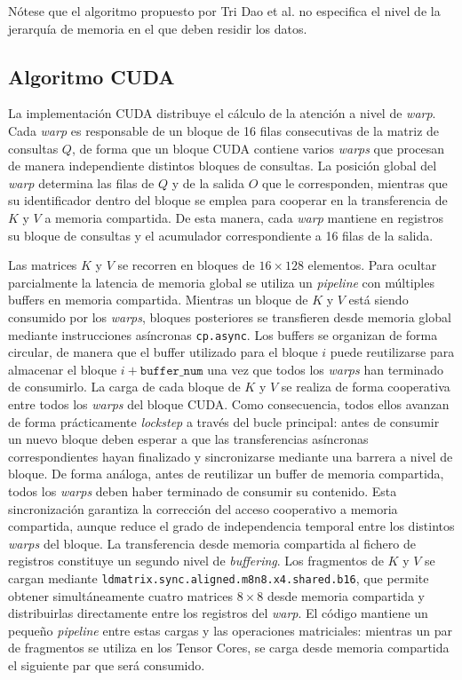 Nótese que el algoritmo propuesto por Tri Dao et al. no especifica el nivel de la jerarquía de memoria en el que deben residir los datos.

\subsection{Algoritmo CUDA}

La implementación CUDA distribuye el cálculo de la atención a nivel de \textit{warp}. Cada \textit{warp} es responsable de un bloque de 16 filas consecutivas de la matriz de consultas \(Q\), de forma que un bloque CUDA contiene varios \textit{warps} que procesan de manera independiente distintos bloques de consultas. La posición global del \textit{warp} determina las filas de \(Q\) y de la salida \(O\) que le corresponden, mientras que su identificador dentro del bloque se emplea para cooperar en la transferencia de \(K\) y \(V\) a memoria compartida. De esta manera, cada \textit{warp} mantiene en registros su bloque de consultas y el acumulador correspondiente a 16 filas de la salida.

Las matrices \(K\) y \(V\) se recorren en bloques de \(16\times128\) elementos. Para ocultar parcialmente la latencia de memoria global se utiliza un \textit{pipeline} con múltiples buffers en memoria compartida. Mientras un bloque de \(K\) y \(V\) está siendo consumido por los \textit{warps}, bloques posteriores se transfieren desde memoria global mediante instrucciones asíncronas \texttt{cp.async}. Los buffers se organizan de forma circular, de manera que el buffer utilizado para el bloque \(i\) puede reutilizarse para almacenar el bloque \(i+\texttt{buffer\_num}\) una vez que todos los \textit{warps} han terminado de consumirlo. La carga de cada bloque de \(K\) y \(V\) se realiza de forma cooperativa entre todos los \textit{warps} del bloque CUDA. Como consecuencia, todos ellos avanzan de forma prácticamente \textit{lockstep} a través del bucle principal: antes de consumir un nuevo bloque deben esperar a que las transferencias asíncronas correspondientes hayan finalizado y sincronizarse mediante una barrera a nivel de bloque. De forma análoga, antes de reutilizar un buffer de memoria compartida, todos los \textit{warps} deben haber terminado de consumir su contenido. Esta sincronización garantiza la corrección del acceso cooperativo a memoria compartida, aunque reduce el grado de independencia temporal entre los distintos \textit{warps} del bloque.
La transferencia desde memoria compartida al fichero de registros constituye un segundo nivel de \textit{buffering}. Los fragmentos de \(K\) y \(V\) se cargan mediante \texttt{ldmatrix.sync.aligned.m8n8.x4.shared.b16}, que permite obtener simultáneamente cuatro matrices \(8\times8\) desde memoria compartida y distribuirlas directamente entre los registros del \textit{warp}. El código mantiene un pequeño \textit{pipeline} entre estas cargas y las operaciones matriciales: mientras un par de fragmentos se utiliza en los Tensor Cores, se carga desde memoria compartida el siguiente par que será consumido.

